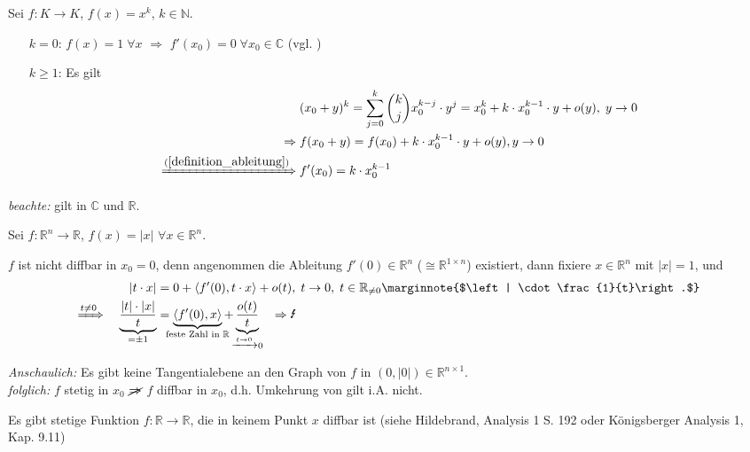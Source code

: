 \begin{example}
	Sei $f:K\to K$, $f(x) = x^k$, $k\in\mathbb{N}$.
	\begin{itemize}[leftmargin=]
		\item[$k=0$:] $f(x) = 1\;\forall x$ $\Rightarrow$ $f'(x_0) = 0\;\forall x_0\in\mathbb{C}$ (vgl. )
		\item[$k\ge 1$:] Es gilt
		\zeroAmsmathAlignVSpaces
		\begin{align*}
			& (x_0 + y)^k = \sum_{j=0}^{k}\binom{k}{j} x_0^{k-j}\cdot y^j = x_0^k + k\cdot x_0^{k-1}\cdot y + o(y),\;y\to 0 \\
			\Rightarrow\;& f(x_0 + y) = f(x_0) + k\cdot x_0^{k-1}\cdot y + o(y), y\to 0 \\
			\xRightarrow{(\ref{definition_ableitung})}\;& f'(x_0) = k\cdot x_0^{k-1}
		\end{align*}
	\end{itemize}
	\emph{beachte:} gilt in $\mathbb{C}$ und $\mathbb{R}$.
\end{example}

\begin{example}
	Sei $f:\mathbb{R}^n\to \mathbb{R}$, $f(x) = \vert x \vert$ $\forall x\in\mathbb{R}^n$.
	
	$f$ ist nicht \gls{diffbar} in $x_0=0$, denn angenommen die Ableitung $f'(0)\in\mathbb{R}^n$ ($\cong \mathbb{R}^{1 \times n}$) existiert, dann fixiere $x\in\mathbb{R}^n$ mit $\vert x \vert = 1$, und
	\begin{alignat*}{2}
		&& \vert t\cdot x\vert &= 0 + \langle f'(0), t\cdot x \rangle + o(t),\;t\to 0,\; t\in\mathbb{R}_{\neq 0} \marginnote{$\left| \cdot \frac{1}{t}\right.$} \\
		\xRightarrow{t\neq 0}\;&& \underbrace{\frac{\vert t \vert \cdot \vert x \vert}{t}}_{=\pm 1} &= \underbrace{\langle f'(0), x\rangle}_{\mathclap{\text{feste Zahl in $\mathbb{R}$}}} + \underbrace{\frac{o(t)}{t}}_{\mathclap{\xrightarrow{t\to 0}0}} \quad\Rightarrow \text{\Lightning}
	\end{alignat*}
	
	\emph{Anschaulich:} Es gibt keine Tangentialebene an den Graph von $f$ in $(0, \vert 0 \vert )\in\mathbb{R}^{n\times 1}$.\\
	\emph{folglich:} $f$ stetig in $x_0$ $\cancel{\Rightarrow}$ $f$ \gls{diffbar} in $x_0$, d.h. Umkehrung von  gilt i.A. nicht.
	
	\begin{hint}
		Es gibt stetige Funktion $f:\mathbb{R}\to \mathbb{R}$, die in keinem Punkt $x$ \gls{diffbar} ist (siehe Hildebrand, Analysis 1 S. 192 oder Königsberger Analysis 1, Kap. 9.11)
	\end{hint}
\end{example}

